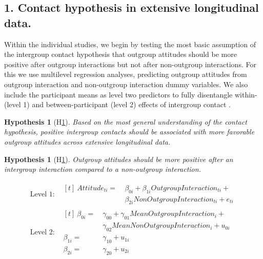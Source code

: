 \documentclass[man, 12pt, a4paper, mask]{apa7}
\theoremstyle{break}
\theoremstyle{plain}
\newtheorem{hyp}{Hypothesis}
\newtheorem{subhyp}{Hypothesis}
\begin{document}
\subsection{1. Contact hypothesis in extensive longitudinal data.} 
Within the individual studies, we begin by testing the most basic assumption of the intergroup contact hypothesis that outgroup attitudes should be more positive after outgroup interactions but not after non-outgroup interactions. For this we use multilevel regression analyses, predicting outgroup attitudes from outgroup interaction and non-outgroup interaction dummy variables. We also include the participant means as level two predictors to fully disentangle within- (level 1) and between-participant (level 2) effects of intergroup contact \citep[e.g.,][Section 4.6]{snijders2012}.

\begin{mdframed}[style=mdfhypothesis]
    \begin{hyp}[H\ref{hyp:contactHyp}] \label{hyp:contactHyp}
        Based on the most general understanding of the contact hypothesis, positive intergroup contacts should be associated with more favorable outgroup attitudes across extensive longitudinal data.
    \end{hyp}
    
    \begin{subhyp}[H\ref{hyp:contactDummyML}] \label{hyp:contactDummyML}
    \addtolength{\leftskip}{\subhypskip}
    Outgroup attitudes should be more positive after an intergroup interaction compared to a non-outgroup interaction.
    \end{subhyp}

    \begin{fleqn}[\eqskip] 
    \begin{equation} \label{eq:ContactDummy}
      \begin{split}
        \textrm{Level 1:} &
          \begin{aligned}[t]
            \ Attitude_{ti} =  &\ \beta_{0i} + \beta_{1i}OutgroupInteraction_{ti} + \\
                               &\ \beta_{2i}NonOutgroupInteraction_{ti} + e_{ti}
          \end{aligned} \\
        \textrm{Level 2:} &
            \begin{aligned}[t]
                \ \beta_{0i} = &\ \gamma_{00} + \gamma_{01}MeanOutgroupInteraction_{i} + \\
                               &\ \gamma_{02}MeanNonOutgroupInteraction_{i} + u_{0i} \\
                  \beta_{1i} = &\ \gamma_{10} + u_{1i} \\
                  \beta_{2i} = &\ \gamma_{20} + u_{2i}
            \end{aligned}
      \end{split} 
    \end{equation}
    \end{fleqn}
\end{mdframed}
\end{document}
